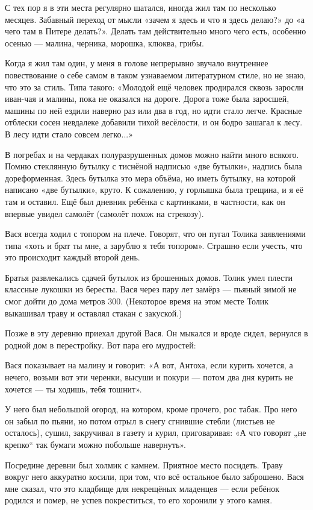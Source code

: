 \documentclass{book}
\begin{document}
С тех пор я в эти места регулярно шатался, иногда жил там по несколько месяцев.
Забавный переход от мысли «зачем я здесь и что я здесь делаю?» до «а чего там в Питере делать?».
Делать там действительно много чего есть, особенно осенью --- малина, черника, морошка, клюква, грибы.

Когда я жил там один, у меня в голове непрерывно звучало внутреннее повествование о себе самом в таком узнаваемом литературном стиле, но не знаю, что это за стиль.
Типа такого: «Молодой ещё человек продирался сквозь заросли иван-чая и малины, пока не оказался на дороге.
Дорога тоже была заросшей, машины по ней ездили наверно раз или два в год, но идти стало легче.
Красные отблески сосен невдалеке добавили тихой весёлости, и он бодро зашагал к лесу.
В лесу идти стало совсем легко...»

В погребах и на чердаках полуразрушенных домов можно найти много всякого.
Помню стеклянную бутылку с тиснёной надписью «две бутылки», надпись была дореформенная.
Здесь бутылка это мера объёма, но иметь бутылку, на которой написано «две бутылки», круто.
К сожалению, у горлышка была трещина, и я её там и оставил.
Ещё был дневник ребёнка с картинками, в частности, как он впервые увидел самолёт (самолёт похож на стрекозу).

Вася всегда ходил с топором на плече.
Говорят, что он пугал Толика заявлениями типа «хоть и брат ты мне, а зарублю я тебя топором».
Страшно если учесть, что это происходит каждый второй день.

Братья развлекались сдачей бутылок из брошенных домов.
Толик умел плести классные лукошки из бересты.
Вася через пару лет замёрз --- пьяный зимой не смог дойти до дома метров 300.
(Некоторое время на этом месте Толик выкашивал траву и оставлял стакан с закуской.) 

Позже в эту деревню приехал другой Вася.
Он мыкался и вроде сидел, вернулся в родной дом в перестройку.
Вот пара его мудростей:

Вася показывает на малину и говорит: «А вот, Антоха, если курить хочется, а нечего, возьми вот эти черенки, высуши и покури --- потом два дня курить не хочется --- ты ходишь, тебя тошнит».

У него был небольшой огород, на котором, кроме прочего, рос табак.
Про него он забыл по пьяни, но потом отрыл в снегу сгнившие стебли (листьев не осталось), сушил, закручивал в газету и курил, приговаривая: «А что говорят „не крепко“ так бумаги можно побольше навернуть».

Посредине деревни был холмик с камнем.
Приятное место посидеть.
Траву вокруг него аккуратно косили, при том, что всё остальное было заброшено.
Вася мне сказал, что это кладбище для некрещёных младенцев --- если ребёнок родился и помер, не успев покреститься, то его хоронили у этого камня.
\end{document}
